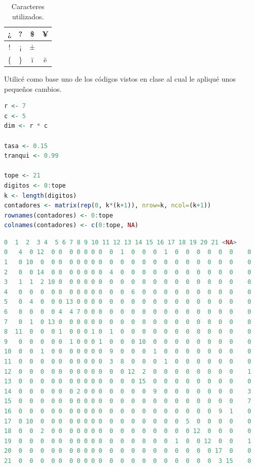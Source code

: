\documentclass{article}
\begin{document}
\begin{table}[ht]
    \centering
    \caption{Caracteres utilizados.} 
    \begin{tabular}{|c|c|c|c|}
    \hline
     ¿ & ? & \$ & ¥ \\
    \hline
    ! & ¡ & ± &  \\
    \hline
    \{ & \} & ï & ë \\
    \hline
\end{tabular}
    \label{cuadro 5}
\end{table}
\newpage
Utilic\'e como base uno de los c\'odigos vistos en clase \citep{CBase} al cual le apliqu\'e unos pequeños cambios.


\begin{lstlisting}[language=R, caption= Segmento de c\'odigo reto 1.]
r <- 7
c <- 5
dim <- r * c

tasa <- 0.15
tranqui <- 0.99

tope <- 21
digitos <- 0:tope
k <- length(digitos)
contadores <- matrix(rep(0, k*(k+1)), nrow=k, ncol=(k+1))
rownames(contadores) <- 0:tope
colnames(contadores) <- c(0:tope, NA)
\end{lstlisting}


\begin{lstlisting}[language=R, caption= Matriz de confusi\'on.]
   0  1  2  3 4  5 6 7 8 9 10 11 12 13 14 15 16 17 18 19 20 21 <NA>
0   4  0 12  0 0  0 0 0 0 0  0  1  0  0  0  1  0  0  0  0  0  0    0
1   0 10  0  0 0  0 0 0 0 0  0  0  0  0  0  0  0  0  0  0  0  0    0
2   0  0 14  0 0  0 0 0 0 0  4  0  0  0  0  0  0  0  0  0  0  0    0
3   1  1  2 10 0  0 0 0 0 0  0  0  0  0  0  0  0  0  0  0  0  0    0
4   0  0  0  0 0  0 0 0 0 0  0  0  6  0  0  0  0  0  0  0  0  0    0
5   0  4  0  0 0 13 0 0 0 0  0  0  0  0  0  0  0  0  0  0  0  0    0
6   0  0  0  0 4  4 7 0 0 0  0  0  0  0  0  0  0  0  0  0  0  0    0
7   0  1  0 13 0  0 0 0 0 0  0  0  0  0  0  0  0  0  0  0  0  0    0
8  11  0  0  0 1  0 0 0 1 0  1  0  0  0  0  0  0  0  0  0  0  0    0
9   0  0  0  0 0  1 0 0 0 1  0  0  0 10  0  0  0  0  0  0  0  0    0
10  0  0  1  0 0  0 0 0 0 0  9  0  0  0  1  0  0  0  0  0  0  0    0
11  0  0  0  0 0  0 0 0 0 0  3  8  0  0  0  1  0  0  0  0  0  0    0
12  0  0  0  0 0  0 0 0 0 0  0  0 12  2  0  0  0  0  0  0  0  0    1
13  0  0  0  0 0  0 0 0 0 0  0  0  0 15  0  0  0  0  0  0  0  0    0
14  0  0  0  0 0  0 2 0 0 0  0  0  0  0  9  0  0  0  0  0  0  0    3
15  0  0  0  0 0  0 0 0 0 0  0  0  0  0  0  0  0  0  0  0  0  0    7
16  0  0  0  0 0  0 0 0 0 0  0  0  0  0  0  0  0  0  0  0  9  1    0
17  0 10  0  0 0  0 0 0 0 0  0  0  0  0  0  0  0  5  0  0  0  0    0
18  0  0  2  0 0  0 0 0 0 0  0  0  0  0  0  0  0  0 12  0  0  0    0
19  0  0  0  0 0  0 0 0 0 0  0  0  0  0  0  0  1  0  0 12  0  0    1
20  0  0  0  0 0  0 0 0 0 0  0  0  0  0  0  0  0  0  0  0 17  0    0
21  0  0  0  0 0  0 0 0 0 0  0  0  0  0  0  0  0  0  0  0  3 15    0
\end{lstlisting}
\end{document}
